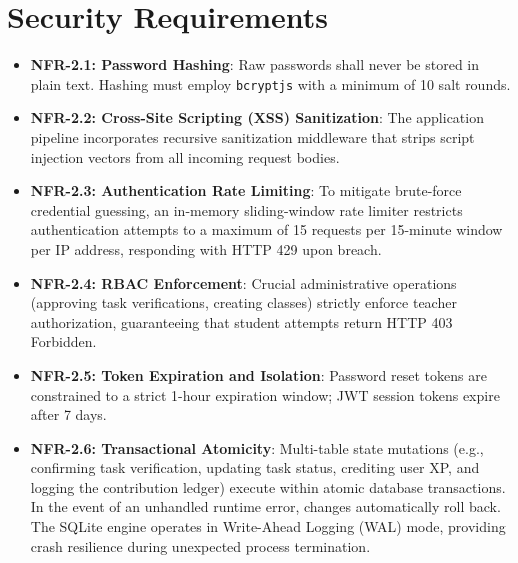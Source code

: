 \documentclass{scrreprt}
\begin{document}
\section{Security Requirements}\label{sec:security}
\begin{itemize}
    \item \textbf{NFR-2.1: Password Hashing}: Raw passwords shall never be stored in plain text. Hashing must employ \texttt{bcryptjs} with a minimum of 10 salt rounds.
    \item \textbf{NFR-2.2: Cross-Site Scripting (XSS) Sanitization}: The application pipeline incorporates recursive sanitization middleware that strips script injection vectors from all incoming request bodies.
    \item \textbf{NFR-2.3: Authentication Rate Limiting}: To mitigate brute-force credential guessing, an in-memory sliding-window rate limiter restricts authentication attempts to a maximum of 15 requests per 15-minute window per IP address, responding with HTTP 429 upon breach.
    \item \textbf{NFR-2.4: RBAC Enforcement}: Crucial administrative operations (approving task verifications, creating classes) strictly enforce teacher authorization, guaranteeing that student attempts return HTTP 403 Forbidden.
    \item \textbf{NFR-2.5: Token Expiration and Isolation}: Password reset tokens are constrained to a strict 1-hour expiration window; JWT session tokens expire after 7 days.
    \item \textbf{NFR-2.6: Transactional Atomicity}: Multi-table state mutations (e.g., confirming task verification, updating task status, crediting user XP, and logging the contribution ledger) execute within atomic database transactions. In the event of an unhandled runtime error, changes automatically roll back. The SQLite engine operates in Write-Ahead Logging (WAL) mode, providing crash resilience during unexpected process termination.
\end{itemize}
\end{document}
